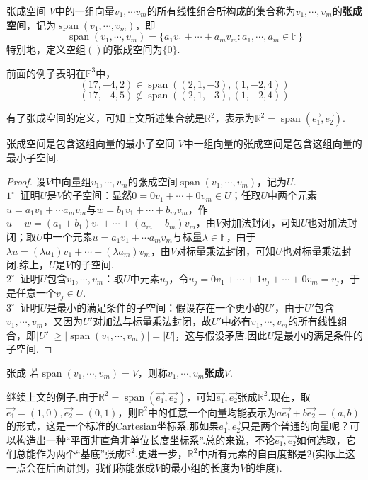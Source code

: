\documentclass[lang=cn, zihao=5]{elegantbook}
\newcommand{\xl}[1]{\overrightarrow{#1}}
\newcommand{\R}{\mathbb{R}}
\newcommand{\F}{\mathbb{F}}
\newcommand{\buzhou}[1]{$#1^{\circ} \ $}
\DeclareMathOperator{\spn}{span}
\begin{document}
\begin{definition}{张成空间}
	$V$中的一组向量$v_1, \cdots v_m$的所有线性组合所构成的集合称为$v_1 , \cdots ,v_m$的\textbf{张成空间}，记为$\spn (v_1, \cdots ,v_m)$，即$$\spn (v_1, \cdots ,v_m) = \{ a_1v_1 + \cdots + a_mv_m : a_1 ,\cdots ,a_m \in \F \}$$
	特别地，定义空组$()$的张成空间为$\{ 0 \}$.
\end{definition}

\begin{example}
	前面的例子表明在$\F ^3$中，
	$$(17,-4,2) \in \spn ((2,1,-3),(1,-2,4))$$
	$$(17,-4,5) \notin \spn ((2,1,-3),(1,-2,4))$$
\end{example}

有了张成空间的定义，可知上文所述集合就是$\R ^2$，表示为$\R ^2 = \spn (\xl{e_1},\xl{e_2})$.

\begin{proposition}{张成空间是包含这组向量的最小子空间}
	$V$中一组向量的张成空间是包含这组向量的最小子空间.
\end{proposition}
\begin{proof}
	设$V$中向量组$v_1, \cdots ,v_m$的张成空间$\spn (v_1, \cdots ,v_m)$，记为$U$. \\
	\buzhou{1} 证明$U$是$V$的子空间：显然$0=0v_1 + \cdots + 0v_m \in U$；任取$U$中两个元素$u=a_1v_1 + \cdots a_mv_m$与$w=b_1v_1 + \cdots + b_mv_m$，作$u+w = (a_1+b_1)v_1 + \cdots + (a_m+b_m)v_m$，由$V$对加法封闭，可知$U$也对加法封闭；取$U$中一个元素$u=a_1v_1 + \cdots a_mv_m$与标量$\lambda \in \F$，由于$\lambda u = (\lambda a_1) v_1 + \cdots + (\lambda a_m)v_m$，由$V$对标量乘法封闭，可知$U$也对标量乘法封闭.综上，$U$是$V$的子空间.\\
    \buzhou{2} 证明$U$包含$v_1,\cdots ,v_m$：取$U$中元素$u_j$，令$u_j=0v_1 + \cdots + 1v_j + \cdots + 0v_m = v_j$，于是任意一个$v_j \in U$. \\
    \buzhou{3} 证明$U$是最小的满足条件的子空间：假设存在一个更小的$U'$，由于$U'$包含$v_1, \cdots ,v_m$，又因为$U'$对加法与标量乘法封闭，故$U'$中必有$v_1, \cdots ,v_m$的所有线性组合，即$|U'| \geq |\spn (v_1, \cdots ,v_m)| = |U|$，这与假设矛盾.因此$U$是最小的满足条件的子空间.
\end{proof}

\begin{definition}{张成}
	若$\spn (v_1, \cdots ,v_m) = V$，则称$v_1, \cdots ,v_m$\textbf{张成}$V$.
\end{definition}

继续上文的例子.由于$\R ^2 = \spn (\xl{e_1},\xl{e_2})$，可知$\xl{e_1},\xl{e_2}$张成$\R ^2$.现在，取$\xl{e_1} = (1,0),\xl{e_2} = (0,1)$，则$\R ^2$中的任意一个向量均能表示为$a\xl{e_1} + b\xl{e_2} = (a,b)$的形式，这是一个标准的Cartesian坐标系.那如果$\xl{e_1},\xl{e_2}$只是两个普通的向量呢？可以构造出一种“平面非直角非单位长度坐标系”.总的来说，不论$\xl{e_1},\xl{e_2}$如何选取，它们总能作为两个“基底”张成$\R ^2$.更进一步，$\R ^{2}$中所有元素的自由度都是$2$(实际上这一点会在后面讲到，我们称能张成$V$的最小组的长度为$V$的维度).
\end{document}
